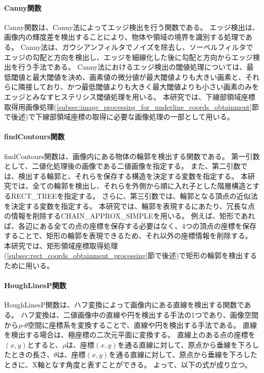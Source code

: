 \paragraph{Canny関数}
Canny関数は、Canny法によってエッジ検出を行う関数である。
エッジ検出は、画像内の輝度差を検出することにより、物体や領域の境界を識別する処理である\cite{エッジ検出}。
Canny法は、ガウシアンフィルタでノイズを除去し、ソーベルフィルタでエッジの勾配と方向を検出し、エッジを細線化した後に勾配と方向からエッジ検出を行う手法である。
Canny法におけるエッジ検出の閾値処理については、最低閾値と最大閾値を決め、画素値の微分値が最大閾値よりも大きい画素と、それらに隣接しており、かつ最低閾値よりも大きく最大閾値よりも小さい画素のみをエッジとみなすヒステリシス閾値処理を用いる\cite{Canny法}。
本研究では、下線部領域座標取得用画像処理(\ref{subsec:image_processing_for_underline_coords_obtainment}節で後述)で下線部領域座標の取得に必要な画像処理の一部として用いる。

\paragraph{findContours関数}
findContours関数は、画像内にある物体の輪郭を検出する関数である。
第一引数として、二値化処理後の画像である二値画像を指定する。
また、第二引数では、検出する輪郭と、それらを保存する構造を決定する変数を指定する。
本研究では、全ての輪郭を検出し、それらを外側から順に入れ子とした階層構造とするRECT\_TREEを指定する。
さらに、第三引数では、輪郭となる頂点の近似法を決定する変数を指定する。
本研究では、輪郭を表現するにあたり、冗長な点の情報を削除するCHAIN\_APPROX\_SIMPLEを用いる。
例えば、矩形であれば、各辺にある全ての点の座標を保存する必要はなく、4つの頂点の座標を保存することで、矩形の輪郭を表現できるため、それ以外の座標情報を削除する\cite{輪郭検出}。
本研究では、矩形領域座標取得処理(\ref{subsec:rect_coords_obtainment_processing}節で後述)で矩形の輪郭を検出するために用いる。

\paragraph{HoughLinesP関数}
HoughLinesP関数は、ハフ変換によって画像内にある直線を検出する関数である\cite{ハフ変換}。
ハフ変換は、二値画像中の直線や円を検出する手法の1つであり、画像空間から$\rho$-$\theta$空間に座標系を変換することで、直線や円を検出する手法である。
直線を検出する場合は、極座標の二次元平面に変換する。
直線上のある点の座標を$(x, y)$とすると、$\rho$は、座標$(x, y)$を通る直線に対して、原点から垂線を下ろしたときの長さ、$\theta$は、座標$(x, y)$を通る直線に対して、原点から垂線を下ろしたときに、X軸となす角度と表すことができる。
よって、以下の式が成り立つ。

